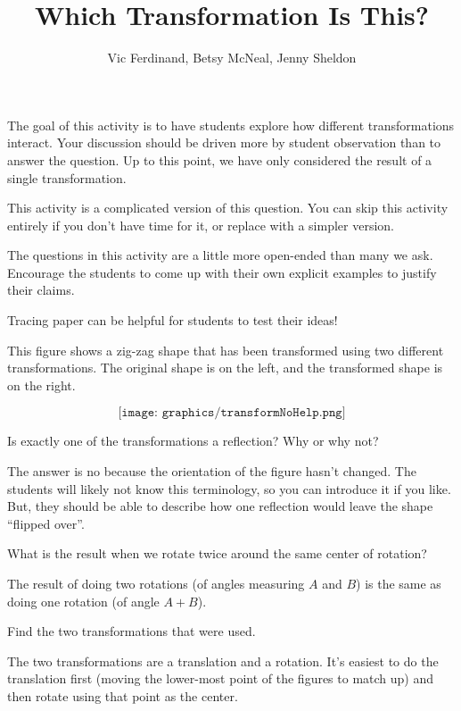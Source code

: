 \documentclass{ximera}
\title{Which Transformation Is This?}
\author{Vic Ferdinand, Betsy McNeal, Jenny Sheldon}
\begin{document}
\begin{abstract}
\end{abstract}
\maketitle

\begin{instructorIntro}

The goal of this activity is to have students explore how different transformations interact.  Your discussion should be driven more by student observation than to answer the question.  Up to this point, we have only considered the result of a single transformation.

This activity is a complicated version of this question.  You can skip this activity entirely if you don't have time for it, or replace with a simpler version.

The questions in this activity are a little more open-ended than many we ask.  Encourage the students to come up with their own explicit examples to justify their claims.

Tracing paper can be helpful for students to test their ideas!
\end{instructorIntro}

This figure shows a zig-zag shape that has been transformed using two different transformations.  The original shape is on the left, and the transformed shape is on the right.

\[
\texttt{[image: graphics/transformNoHelp.png]}
\]

\begin{problem}
Is exactly one of the transformations a reflection?  Why or why not?
\begin{instructorNotes}
The answer is no because the orientation of the figure hasn't changed.  The students will likely not know this terminology, so you can introduce it if you like.  But, they should be able to describe how one reflection would leave the shape ``flipped over''.
\end{instructorNotes}
\end{problem}

\begin{problem}
What is the result when we rotate twice around the same center of rotation? 
\begin{instructorNotes}
The result of doing two rotations (of angles measuring $A$ and $B$) is the same as doing one rotation (of angle $A+B$).
\end{instructorNotes}
\end{problem}

\begin{problem}
Find the two transformations that were used.
\begin{instructorNotes}
The two transformations are a translation and a rotation.  It's easiest to do the translation first (moving the lower-most point of the figures to match up) and then rotate using that point as the center.
\end{instructorNotes}
\end{problem}
\end{document}
